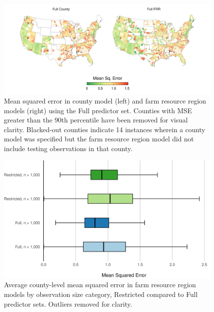 \documentclass[12pt]{article}
\begin{document}
\begin{figure}[H]
    \centering
    \includegraphics[width=1\textwidth]{exhibits/compare_ffb_fcb_mse.png}
    \caption{Mean squared error in county model (left) and farm resource region models (right) using the Full predictor set. Counties with MSE greater than the 90th percentile have been removed for visual clarity. Blacked-out counties indicate 14 instances wherein a county model was specified but the farm resource region model did not include testing observations in that county.}
    \label{fig:compare_ffb_fcb_mse}
\end{figure}

\begin{figure}[H]
    \centering
    \includegraphics[width=1\textwidth]{exhibits/frr_compare_mse_size.png}
    \caption{Average county-level mean squared error in farm resource region models by observation size category, Restricted compared to Full predictor sets. Outliers removed for clarity.}
    \label{fig:frr_compare_mse_size}
\end{figure}
\end{document}
